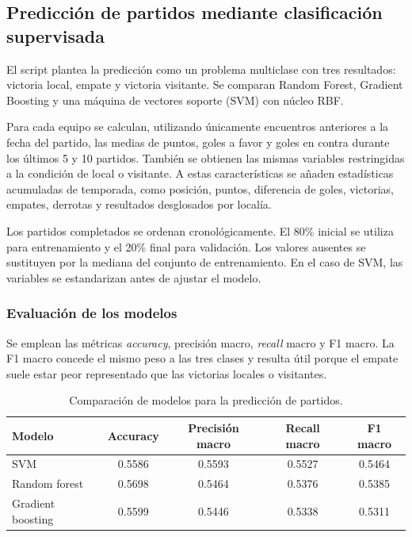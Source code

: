 \subsection{Predicción de partidos mediante clasificación supervisada}

El script  plantea la predicción como un problema multiclase con tres resultados: victoria local, empate y victoria visitante. Se comparan Random Forest, Gradient Boosting y una máquina de vectores soporte (SVM) con núcleo RBF.

Para cada equipo se calculan, utilizando únicamente encuentros anteriores a la fecha del partido, las medias de puntos, goles a favor y goles en contra durante los últimos 5 y 10 partidos. También se obtienen las mismas variables restringidas a la condición de local o visitante. A estas características se añaden estadísticas acumuladas de temporada, como posición, puntos, diferencia de goles, victorias, empates, derrotas y resultados desglosados por localía.

Los partidos completados se ordenan cronológicamente. El 80\% inicial se utiliza para entrenamiento y el 20\% final para validación. Los valores ausentes se sustituyen por la mediana del conjunto de entrenamiento. En el caso de SVM, las variables se estandarizan antes de ajustar el modelo.

\subsubsection{Evaluación de los modelos}

Se emplean las métricas \textit{accuracy}, precisión macro, \textit{recall} macro y F1 macro. La F1 macro concede el mismo peso a las tres clases y resulta útil porque el empate suele estar peor representado que las victorias locales o visitantes.

\begin{table}[H]
\centering
\caption{Comparación de modelos para la predicción de partidos.}
\label{tab:evaluacion_prediccion}
\begin{tabular}{|l|c|c|c|c|}
\hline
\textbf{Modelo} & \textbf{Accuracy} & \textbf{Precisión macro} & \textbf{Recall macro} & \textbf{F1 macro} \\
\hline
SVM & 0.5586 & 0.5593 & 0.5527 & 0.5464 \\
\hline
Random forest & 0.5698 & 0.5464 & 0.5376 & 0.5385 \\
\hline
Gradient boosting & 0.5599 & 0.5446 & 0.5338 & 0.5311 \\
\hline
\end{tabular}
\end{table}

